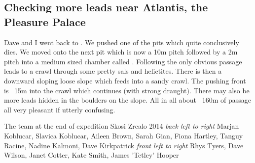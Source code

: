 \subsection{Checking more leads near Atlantis, the Pleasure Palace}

Dave and I went back to . We pushed one of the pits which quite conclusively dies. We moved onto the next pit which is now a 10m pitch followed by a 2m pitch into a medium sized chamber called . Following the only obvious passage leads to  a crawl through some pretty sals and helictites. There is then a downward sloping loose slope which feeds into a sandy crawl. The pushing front is ~15m into the crawl which continues (with strong draught). There may also be more leads hidden in the boulders on the slope. All in all about ~160m of passage all very pleasant if utterly confusing. 



\begin{pagefigure}
\checkoddpage \ifoddpage \forcerectofloat \else \forceversofloat \fi
\centering
{}
\caption{The team at the end of expedition Skosi Zrcalo 2014  \emph{back left to right} Marjan Koblucar, Slavica Koblucar, Aileen Brown, Sarah Gian, Fiona Hartley, Tanguy Racine, Nadine Kalmoni, Dave Kirkpatrick \emph{front left to right} Rhys Tyers, Dave Wilson, Janet Cotter, Kate Smith, James 'Tetley' Hooper}
\label{end of expo 2}
\end{pagefigure}




\begin{figure}[t!]
\centering
{}
\caption{}
\label{}
\end{figure}

\begin{figure}[t!]
\centering
{}
\caption{}
\label{}
\end{figure}